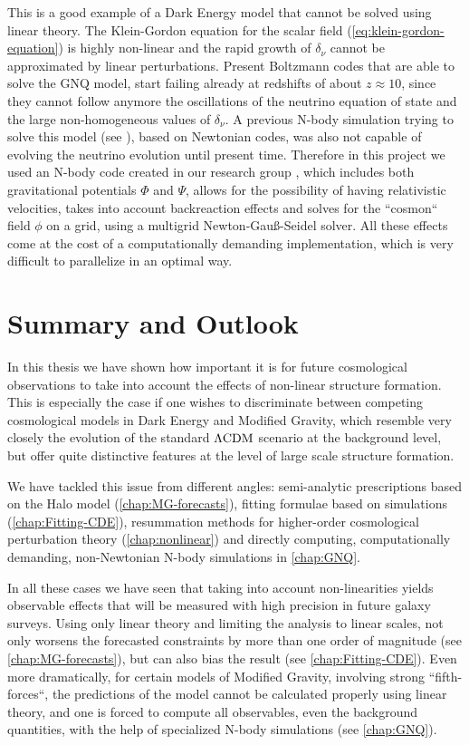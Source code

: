 This is a good example of a Dark Energy model that cannot be solved using linear theory. The Klein-Gordon equation
for the scalar field (\cref{eq:klein-gordon-equation}) is highly non-linear and the rapid growth of $\delta_{\nu}$ cannot be approximated by linear perturbations. Present Boltzmann codes that are able to solve the GNQ model, start failing already at redshifts of about $z\approx 10$, since they cannot follow
anymore the oscillations of the neutrino equation of state and the large non-homogeneous values of $\delta_{\nu}$.
A previous N-body simulation trying to solve this model (see \cite{baldi_oscillating_2011}), based on Newtonian codes, was also 
not capable of evolving the neutrino evolution until present time. Therefore in this project we used an N-body code created 
in our research group \cite{ayaita_nonlinear_2016}, which includes both gravitational potentials $\Phi$ and $\Psi$,
allows for the possibility of having relativistic velocities, takes into account backreaction effects
and solves for the ``cosmon`` field $\phi$ on a grid, using a multigrid Newton-Gauß-Seidel solver.
All these effects come at the cost of a computationally demanding implementation, which is very difficult to parallelize in an optimal way.


\section*{Summary and Outlook}

In this thesis we have shown how important it is for future cosmological observations to take into account
the effects of non-linear structure formation. This is especially the case if one wishes to discriminate
between competing cosmological models in Dark Energy and Modified Gravity, which resemble 
very closely the evolution of the standard $\Lambda\mathrm{CDM}$ scenario at the background level,
but offer quite distinctive features at the level of large scale structure formation.

We have tackled this issue from different angles: 
semi-analytic prescriptions based on the Halo model (\cref{chap:MG-forecasts}), 
fitting formulae based on simulations (\cref{chap:Fitting-CDE}), 
resummation methods for higher-order cosmological perturbation theory (\cref{chap:nonlinear}) and directly computing,
computationally demanding, non-Newtonian N-body simulations in \cref{chap:GNQ}.

In all these cases we have seen that taking into account non-linearities yields observable effects that will
be measured with high precision in future galaxy surveys. Using only linear theory and limiting the 
analysis to linear scales, not only worsens the forecasted constraints by more than one order of magnitude (see 
\cref{chap:MG-forecasts}), but can also bias the result (see \cref{chap:Fitting-CDE}).
Even more dramatically, for certain models of Modified Gravity, involving strong ``fifth-forces``, 
the predictions of the model cannot be calculated properly using linear theory, and one is forced to compute
all observables, even the background quantities, with the help of specialized N-body simulations (see \cref{chap:GNQ}).


